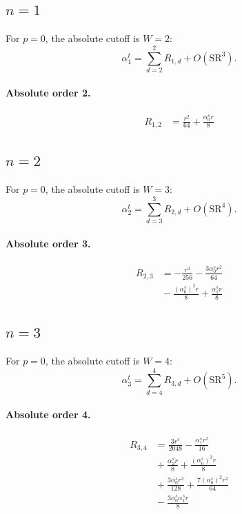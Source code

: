 \documentclass[10pt]{article}
\begin{document}
\subsection{$n=1$}
For $p=0$, the absolute cutoff is $W=2$:
\[\alpha_{1}^t=\sum_{d=2}^{2}R_{1,d}+O(\mathrm{SR}^{3}).\]
\paragraph{Absolute order 2.}
\begin{align*}
R_{1,2} &= \frac{r^{2}}{64} + \frac{\alpha_{0}^s r}{8}
\end{align*}

\subsection{$n=2$}
For $p=0$, the absolute cutoff is $W=3$:
\[\alpha_{2}^t=\sum_{d=3}^{3}R_{2,d}+O(\mathrm{SR}^{4}).\]
\paragraph{Absolute order 3.}
\begin{align*}
R_{2,3} &=  - \frac{r^{3}}{256} - \frac{3 \alpha_{0}^s r^{2}}{64} \\
&{}  - \frac{\left(\alpha_{0}^s\right)^{2} r}{8} + \frac{\alpha_{1}^s r}{8}
\end{align*}

\subsection{$n=3$}
For $p=0$, the absolute cutoff is $W=4$:
\[\alpha_{3}^t=\sum_{d=4}^{4}R_{3,d}+O(\mathrm{SR}^{5}).\]
\paragraph{Absolute order 4.}
\begin{align*}
R_{3,4} &= \frac{3 r^{4}}{2048} - \frac{\alpha_{1}^s r^{2}}{16} \\
&{}  + \frac{\alpha_{2}^s r}{8} + \frac{\left(\alpha_{0}^s\right)^{3} r}{8} \\
&{}  + \frac{3 \alpha_{0}^s r^{3}}{128} + \frac{7 \left(\alpha_{0}^s\right)^{2} r^{2}}{64} \\
&{}  - \frac{3 \alpha_{0}^s \alpha_{1}^s r}{8}
\end{align*}
\end{document}
